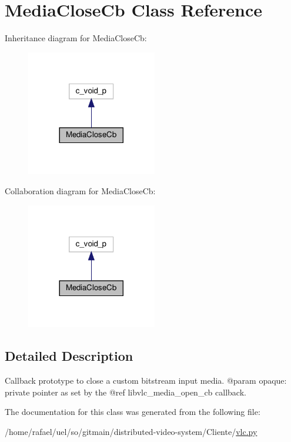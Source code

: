 \hypertarget{classvlc_1_1_media_close_cb}{}\section{Media\+Close\+Cb Class Reference}
\label{classvlc_1_1_media_close_cb}


Inheritance diagram for Media\+Close\+Cb\+:
\nopagebreak
\begin{figure}[H]
\begin{center}
\leavevmode
\includegraphics[width=161pt]{classvlc_1_1_media_close_cb__inherit__graph}
\end{center}
\end{figure}


Collaboration diagram for Media\+Close\+Cb\+:
\nopagebreak
\begin{figure}[H]
\begin{center}
\leavevmode
\includegraphics[width=161pt]{classvlc_1_1_media_close_cb__coll__graph}
\end{center}
\end{figure}


\subsection{Detailed Description}
\begin{DoxyVerb}Callback prototype to close a custom bitstream input media.
@param opaque: private pointer as set by the @ref libvlc_media_open_cb callback.
\end{DoxyVerb}
 

The documentation for this class was generated from the following file\+:\begin{DoxyCompactItemize}
\item 
/home/rafael/uel/so/gitmain/distributed-\/video-\/system/\+Cliente/\hyperlink{vlc_8py}{vlc.\+py}\end{DoxyCompactItemize}
